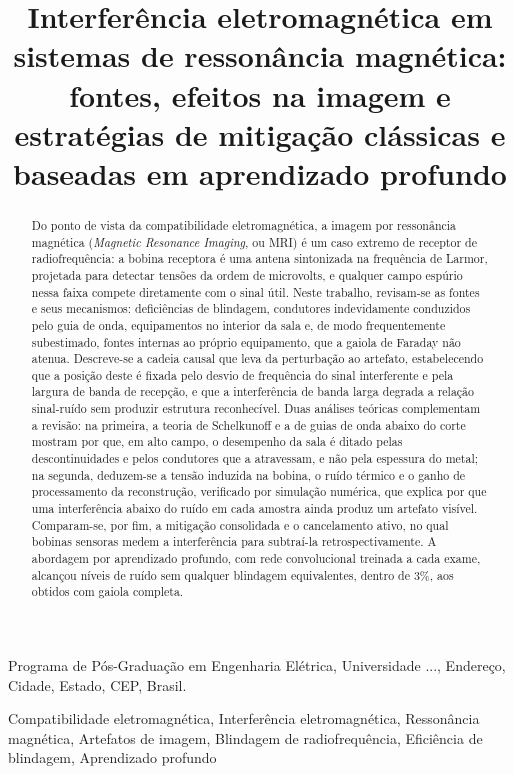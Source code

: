 \documentclass[portuguese]{sbcreviews-2025}%
\title[Interferência eletromagnética em sistemas de ressonância magnética]{Interferência eletromagnética em sistemas de ressonância magnética: fontes, efeitos na imagem e estratégias de mitigação clássicas e baseadas em aprendizado profundo}
\author[Autor et al. 202X]{
\affil{\textbf{Nome do Autor}~\orcidlink{0000-0000-0000-0000}~\textcolor{blue}{\faEnvelope}~~[{Universidade}~|\href{mailto: ...}{~{\textit{...@...br}}}~]}
}
\begin{document}
\begin{frontmatter}

\maketitle

\begin{mail}
Programa de Pós-Graduação em Engenharia Elétrica, Universidade ..., Endereço, Cidade, Estado, CEP, Brasil.
\end{mail}


\begin{abstract}
Do ponto de vista da compatibilidade eletromagnética, a imagem por ressonância magnética (\textit{Magnetic Resonance Imaging}, ou MRI) é um caso extremo de receptor de radiofrequência: a bobina receptora é uma antena sintonizada na frequência de Larmor, projetada para detectar tensões da ordem de microvolts, e qualquer campo espúrio nessa faixa compete diretamente com o sinal útil. Neste trabalho, revisam-se as fontes e seus mecanismos: deficiências de blindagem, condutores indevidamente conduzidos pelo guia de onda, equipamentos no interior da sala e, de modo frequentemente subestimado, fontes internas ao próprio equipamento, que a gaiola de Faraday não atenua. Descreve-se a cadeia causal que leva da perturbação ao artefato, estabelecendo que a posição deste é fixada pelo desvio de frequência do sinal interferente e pela largura de banda de recepção, e que a interferência de banda larga degrada a relação sinal-ruído sem produzir estrutura reconhecível. Duas análises teóricas complementam a revisão: na primeira, a teoria de Schelkunoff e a de guias de onda abaixo do corte mostram por que, em alto campo, o desempenho da sala é ditado pelas descontinuidades e pelos condutores que a atravessam, e não pela espessura do metal; na segunda, deduzem-se a tensão induzida na bobina, o ruído térmico e o ganho de processamento da reconstrução, verificado por simulação numérica, que explica por que uma interferência abaixo do ruído em cada amostra ainda produz um artefato visível. Comparam-se, por fim, a mitigação consolidada e o cancelamento ativo, no qual bobinas sensoras medem a interferência para subtraí-la retrospectivamente. A abordagem por aprendizado profundo, com rede convolucional treinada a cada exame, alcançou níveis de ruído sem qualquer blindagem equivalentes, dentro de 3\%, aos obtidos com gaiola completa.
\end{abstract}


\begin{pchaves}
Compatibilidade eletromagnética, Interferência eletromagnética, Ressonância magnética, Artefatos de imagem, Blindagem de radiofrequência, Eficiência de blindagem, Aprendizado profundo
\end{pchaves}

\end{frontmatter}
\end{document}
